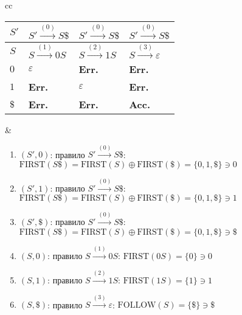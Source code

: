 \documentclass[a4paper]{article}
\def\first{\mathrm{ FIRST} }
\def\follow{\mathrm{ FOLLOW} }
\begin{document}
\begin{enumerate}
\begin{tabular}{cc}
\begin{minipage}{0.29\textwidth}
\begin{tabular}{|l|l|l|l|}
$S'$ & $S'\overset{(0)}{\to}S\$$ & $S'\overset{(0)}{\to}S\$$ & $S'\overset{(0)}{\to}S\$$ \\\hline
$S$ & $S\overset{(1)}{\to}0S$ & $S\overset{(2)}{\to}1S$ & $S\overset{(3)}{\to}\varepsilon$ \\\hline
$0$ & $\varepsilon$ & {\bf Err.} & {\bf Err.}\\\hline
$1$ & {\bf Err.} & $\varepsilon$ & {\bf Err.}\\\hline
$\$$ & {\bf Err.} & {\bf Err.} & {\bf Acc.} \\\hline
\end{tabular}
\end{minipage} &
\begin{minipage}{0.7\textwidth}
\begin{enumerate}
\item $(S',0)$: правило $S'\overset{(0)}{\to}S\$$: $\first(S\$)=\first(S)\oplus\first(\$)=\{0,1,\$\}\ni 0$
\item $(S',1)$: правило $S'\overset{(0)}{\to}S\$$: $\first(S\$)=\first(S)\oplus\first(\$)=\{0,1,\$\}\ni 1$
\item $(S',\$)$: правило $S'\overset{(0)}{\to}S\$$: $\first(S\$)=\first(S)\oplus\first(\$)=\{0,1,\$\}\ni \$$
\item $(S,0)$: правило $S\overset{(1)}{\to}0S$: $\first(0S)=\{0\}\ni 0$
\item $(S,1)$: правило $S\overset{(2)}{\to}1S$: $\first(1S)=\{1\}\ni 1$
\item $(S,\$)$: правило $S\overset{(3)}{\to}\varepsilon$: $\follow(S)=\{\$\}\ni \$$
\end{enumerate}
\end{minipage}
\end{tabular}
\end{enumerate}
\end{document}
